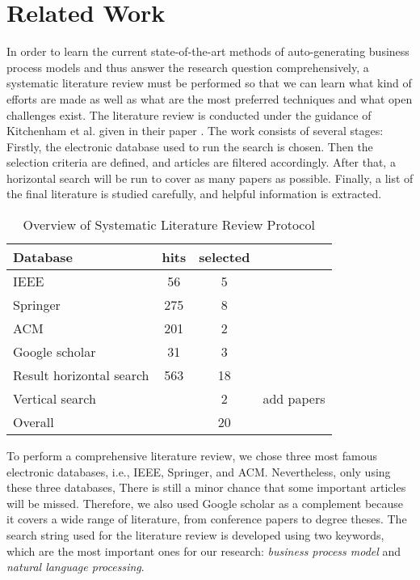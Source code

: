\chapter{Related Work}

	In order to learn the current state-of-the-art methods of auto-generating business process models and thus answer the research question comprehensively, a systematic literature review must be performed so that we can learn what kind of efforts are made as well as what are the most preferred techniques and what open challenges exist. The literature review is conducted under the guidance of Kitchenham et al. given in their paper \cite{literature_review_guidance}. The work consists of several stages: Firstly, the electronic database used to run the search is chosen. Then the selection criteria are defined, and articles are filtered accordingly. After that, a horizontal search will be run to cover as many papers as possible. Finally, a list of the final literature is studied carefully, and helpful information is extracted.

	\begin{table}[]
		\centering
		\caption{\centering Overview of Systematic Literature Review Protocol}
		\begin{tabular}{lccl}
    	\textbf{Database}\hspace{30mm} & \textbf{hits} & \textbf{selected} &  \\
    	\hline
		IEEE                     		& 56   & 5   &      		\\
		Springer                 		& 275  & 8   &      		\\
		ACM                      		& 201  & 2   &      		\\
		Google scholar           		& 31   & 3   &      		\\
		\hline
		Result horizontal search	 	& 563  & 18  &      		\\
		Vertical search          		&      & 2   &  \hspace{5mm}add papers  \\
		\hline
		Overall                  		&      & 20   &     
		\end{tabular}
	\end{table}
	
	To perform a comprehensive literature review, we chose three most famous electronic databases, i.e., IEEE, Springer, and ACM. Nevertheless, only using these three databases, There is still a minor chance that some important articles will be missed. Therefore, we also used Google scholar as a complement because it covers a wide range of literature, from conference papers to degree theses. The search string used for the literature review is developed using two keywords, which are the most important ones for our research: \textit{business process model} and \textit{natural language processing}.
	
